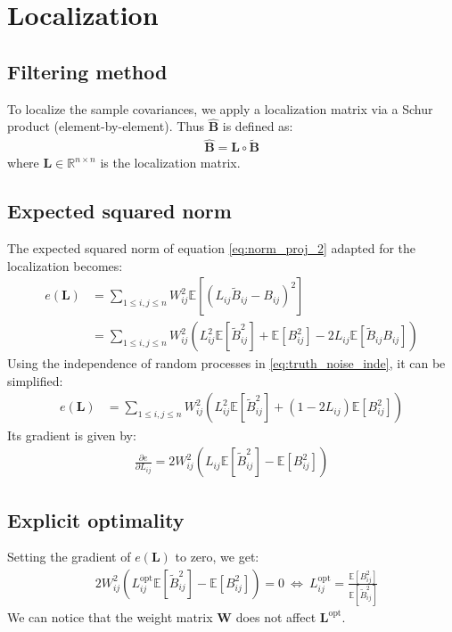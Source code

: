 \documentclass[12pt]{scrartcl}
\begin{document}
\clearpage

\section{Localization}

\subsection{Filtering method}
To localize the sample covariances, we apply a localization matrix via a Schur product (element-by-element). Thus $\widehat{\mathbf{B}}$ is defined as:
\begin{align}
\widehat{\mathbf{B}} = \mathbf{L} \circ \widetilde{\mathbf{B}}
\end{align}
where $\mathbf{L} \in \mathbb{R}^{n \times n}$ is the localization matrix.

\subsection{Expected squared norm}
The expected squared norm of equation \eqref{eq:norm_proj_2} adapted for the localization becomes:
\begin{align}
e(\mathbf{L}) & = \sum_{1 \le i,j \le n} W_{ij}^2 \mathbb{E}\left[ \left(L_{ij} \widetilde{B}_{ij} - B_{ij} \right)^2 \right] \nonumber \\
& = \sum_{1 \le i,j \le n} W_{ij}^2 \left(L^2_{ij} \mathbb{E} \left[\widetilde{B}_{ij}^2\right] + \mathbb{E} \left[B^2_{ij}\right] - 2 L_{ij} \mathbb{E} \left[\widetilde{B}_{ij} B_{ij}\right] \right)
\end{align}
Using the independence of random processes in \eqref{eq:truth_noise_inde}, it can be simplified:
\begin{align}
e(\mathbf{L}) & = \sum_{1 \le i,j \le n} W_{ij}^2 \left(L^2_{ij} \mathbb{E} \left[\widetilde{B}_{ij}^2\right] + \left(1 - 2 L_{ij}\right) \mathbb{E} \left[B^2_{ij}\right] \right)
\end{align}
Its gradient is given by:
\begin{align}
\frac{\partial e}{\partial L_{ij}} = 2 W_{ij}^2 \left(L_{ij} \mathbb{E} \left[\widetilde{B}_{ij}^2\right] - \mathbb{E} \left[B^2_{ij}\right] \right)
\end{align}

\subsection{Explicit optimality}
Setting the gradient of $e(\mathbf{L})$ to zero, we get:
\begin{align}
\label{eq:loc_th}
& 2 W_{ij}^2 \left(L^\mathrm{opt}_{ij} \mathbb{E} \left[\widetilde{B}_{ij}^2\right] - \mathbb{E} \left[B^2_{ij}\right]\right) = 0 \ \Leftrightarrow \ L^\mathrm{opt}_{ij} = \frac{\mathbb{E} \left[B^2_{ij}\right]}{\mathbb{E} \left[\widetilde{B}_{ij}^2\right]}
\end{align}
We can notice that the weight matrix $\mathbf{W}$ does not affect $\mathbf{L}^\mathrm{opt}$.
\end{document}
